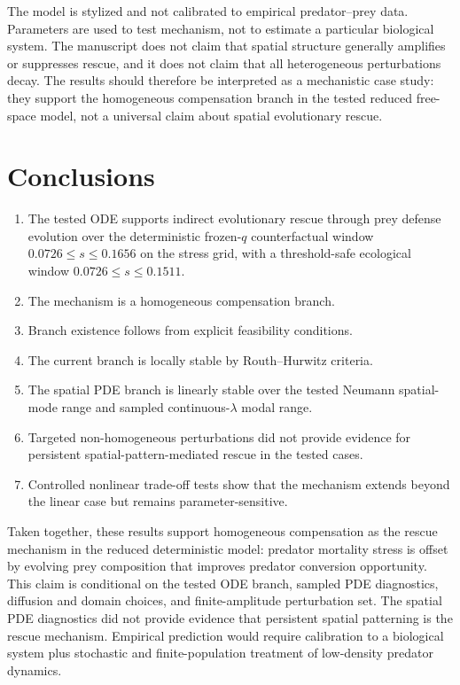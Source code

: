 \documentclass[11pt]{article}
\begin{document}
The model is stylized and not calibrated to empirical predator--prey data. Parameters are used to test mechanism, not to estimate a particular biological system. The manuscript does not claim that spatial structure generally amplifies or suppresses rescue, and it does not claim that all heterogeneous perturbations decay. The results should therefore be interpreted as a mechanistic case study: they support the homogeneous compensation branch in the tested reduced free-space model, not a universal claim about spatial evolutionary rescue.

\section{Conclusions}

\begin{enumerate}
  \item The tested ODE supports indirect evolutionary rescue through prey defense evolution over the deterministic frozen-\(q\) counterfactual window \(0.0726\le s\le0.1656\) on the stress grid, with a threshold-safe ecological window \(0.0726\le s\le0.1511\).
  \item The mechanism is a homogeneous compensation branch.
  \item Branch existence follows from explicit feasibility conditions.
  \item The current branch is locally stable by Routh--Hurwitz criteria.
  \item The spatial PDE branch is linearly stable over the tested Neumann spatial-mode range and sampled continuous-\(\lambda\) modal range.
  \item Targeted non-homogeneous perturbations did not provide evidence for persistent spatial-pattern-mediated rescue in the tested cases.
  \item Controlled nonlinear trade-off tests show that the mechanism extends beyond the linear case but remains parameter-sensitive.
\end{enumerate}

Taken together, these results support homogeneous compensation as the rescue mechanism in the reduced deterministic model: predator mortality stress is offset by evolving prey composition that improves predator conversion opportunity. This claim is conditional on the tested ODE branch, sampled PDE diagnostics, diffusion and domain choices, and finite-amplitude perturbation set. The spatial PDE diagnostics did not provide evidence that persistent spatial patterning is the rescue mechanism. Empirical prediction would require calibration to a biological system plus stochastic and finite-population treatment of low-density predator dynamics.
\end{document}
